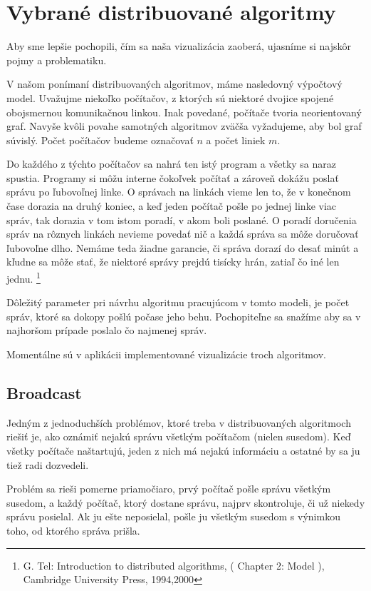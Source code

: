 \section{Vybrané distribuované algoritmy}
Aby sme lepšie pochopili, čím sa naša vizualizácia zaoberá, ujasníme si najskôr pojmy a problematiku.

V našom ponímaní distribuovaných algoritmov, máme nasledovný výpočtový model.
Uvažujme niekoľko počítačov, z ktorých sú niektoré dvojice spojené obojsmernou komunikačnou linkou.
Inak povedané, počítače tvoria neorientovaný graf. Navyše kvôli povahe samotných algoritmov zväčša vyžadujeme,
aby bol graf súvislý. Počet počítačov budeme označovať $n$ a počet liniek $m$.

Do každého z týchto počítačov sa nahrá ten istý program a všetky sa naraz spustia. Programy si môžu
interne čokoľvek počítať a zároveň dokážu poslať správu po ľubovoľnej linke. O správach na linkách
vieme len to, že v konečnom čase dorazia na druhý koniec, a keď jeden počítač pošle po jednej linke
viac správ, tak dorazia v tom istom poradí, v akom boli poslané. O poradí doručenia správ na rôznych
linkách nevieme povedať nič a každá správa sa môže doručovať ľubovoľne dlho. Nemáme teda žiadne garancie, či
správa dorazí do desať minút a kľudne sa môže stať, že niektoré správy prejdú tisícky hrán, zatiaľ čo
iné len jednu.
\footnote{G. Tel: Introduction to distributed algorithms, ( Chapter 2: Model ), Cambridge University
Press, 1994,2000}

Dôležitý parameter pri návrhu algoritmu pracujúcom v tomto modeli, je počet správ, ktoré sa dokopy
pošlú počase jeho behu. Pochopiteľne sa snažíme aby sa v najhoršom prípade poslalo čo najmenej
správ.

Momentálne sú v aplikácii implementované vizualizácie troch algoritmov.

\subsection{Broadcast}

Jedným z jednoduchších problémov, ktoré treba v distribuovaných algoritmoch riešiť je, ako 
oznámiť nejakú správu všetkým počítačom (nielen susedom). Keď všetky počítače naštartujú, 
jeden z nich má nejakú informáciu a ostatné by sa ju tiež radi dozvedeli.

Problém sa rieši pomerne priamočiaro, prvý počítač pošle správu všetkým susedom, a každý
počítač, ktorý dostane správu, najprv skontroluje, či už niekedy správu posielal. 
Ak ju ešte neposielal, pošle ju všetkým susedom s výnimkou toho, od ktorého správa prišla.


